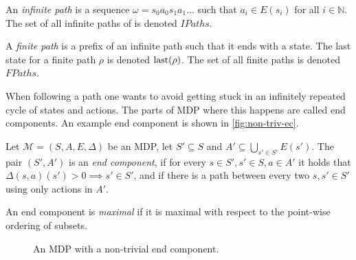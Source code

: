 \begin{definition}[Path]
    An {\em infinite path} is
    a sequence $\omega = s_0 a_0 s_1 a_1
    \ldots$ such that $a_i \in E(s_i)$ for all $i \in \mathbb{N}$.
    The set of all infinite paths of is denoted $IPaths$.

    A {\em finite path} is a prefix of an infinite path such that it
    ends with a state. The last state for a finite path $\rho$ is
    denoted $\operatorname{last}(\rho)$. The set of all finite paths is denoted
    $FPaths$.
\end{definition}

When following a path one wants to avoid getting stuck in
an infinitely repeated cycle of states and actions. The parts of MDP
where this happens are called end components.
An example end component is shown in \autoref{fig:non-triv-ec}.

\begin{definition}
Let $\mathcal{M} = (S, A, E, \Delta)$ be an MDP,
let $S' \subseteq S$ and $A' \subseteq \bigcup_{s' \in S'} E(s')$.
The pair $(S', A')$ is an {\em end component},
if for every $s \in S', s' \in S, a \in A'$ it holds that
$\Delta(s,a)(s') > 0 \implies s' \in S'$,
and if there is a path between every two $s, s' \in S'$
using only actions in $A'$.

An end component is {\em maximal} if it is maximal with respect to
the point-wise ordering of subsets.
\end{definition}

\begin{figure}[ht]
\begin{center}
\end{center}
\caption{An MDP with a non-trivial end component.}
\label{fig:non-triv-ec}
\end{figure}

